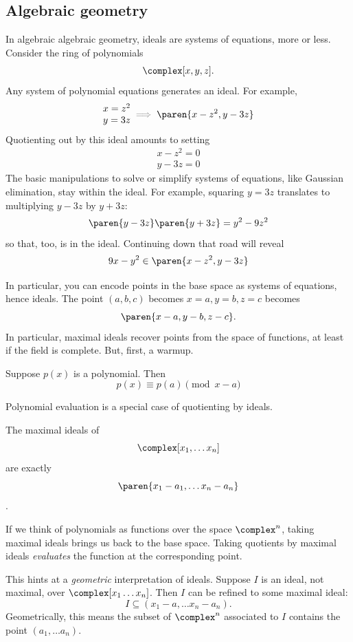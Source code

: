 \documentclass[a5paper]{scrartcl}
\let\oldimplies\implies
\def\implies{\color{gray}\oldimplies\color{black}}
\begin{document}
\subsection{Algebraic geometry}
In algebraic algebraic geometry, ideals are systems of equations, more or less. Consider the ring of polynomials
\[
  \complex[x,y,z].
\]
Any system of polynomial equations generates an ideal. For example,
\[
  \begin{matrix}
    x = z^2 \\
    y = 3z
  \end{matrix}
  \implies
  \paren{x-z^2, y-3z}
\]
Quotienting out by this ideal amounts to setting
\[
  \begin{matrix}
    x-z^2 = 0 \\
    y-3z = 0
  \end{matrix}
\]
The basic manipulations to solve or simplify systems of equations, like Gaussian elimination, stay within the ideal. For example, squaring \(y=3z\) translates to multiplying \(y-3z\) by \(y+3z\):
\[
  \paren{y-3z}\paren{y+3z} = y^2-9z^2
\]
so that, too, is in the ideal. Continuing down that road will reveal
\[
  9x - y^2 \in \paren{x-z^2, y-3z}
\]

In particular, you can encode points in the base space as systems of equations, hence ideals. The point \((a,b,c)\) becomes \(x=a,y=b,z=c\) becomes
\[
  \paren{x-a,y-b,z-c}.
\]
In particular, maximal ideals recover points from the space of functions, at least if the field is complete. But, first, a warmup.
\begin{theorem}
  Suppose \(p(x)\) is a polynomial. Then
  \[
    p(x) \equiv p(a) \pmod {x-a}
  \]
\end{theorem}
Polynomial evaluation is a special case of quotienting by ideals.

\begin{theorem}
  The maximal ideals of
  \[
    \complex[x_1,\dots x_n]
  \]
  are exactly
  \[
    \paren{x_1-a_1,\dots x_n-a_n}
  \]
  \cite[107]{rising-sea2024}.
\end{theorem}
If we think of polynomials as functions over the space \(\complex^n\), taking maximal ideals brings us back to the base space. Taking quotients by maximal ideals \emph{evaluates} the function at the corresponding point.

This hints at a \emph{geometric} interpretation of ideals. Suppose \(I\) is an ideal, not maximal, over \(\complex[x_1\dots x_n]\). Then \(I\) can be refined to some maximal ideal:
\[
  I\subseteq (x_1-a,\dots x_n-a_n).
\]
Geometrically, this means the subset of \(\complex^n\) associated to \(I\) contains the point \((a_1,\dots a_n)\).
\end{document}
